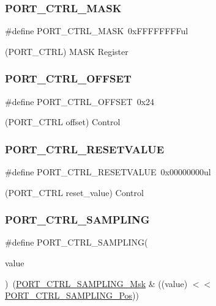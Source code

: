\subsubsection{\texorpdfstring{PORT\_CTRL\_MASK}{PORT\_CTRL\_MASK}}
{\footnotesize\ttfamily \#define P\+O\+R\+T\+\_\+\+C\+T\+R\+L\+\_\+\+M\+A\+SK~0x\+F\+F\+F\+F\+F\+F\+F\+Ful}



(P\+O\+R\+T\+\_\+\+C\+T\+RL) M\+A\+SK Register 

\mbox{\label{group___s_a_m_d21___p_o_r_t_ga3a53a2a2a7695aa20f7827ceafcec8d5}} 
\subsubsection{\texorpdfstring{PORT\_CTRL\_OFFSET}{PORT\_CTRL\_OFFSET}}
{\footnotesize\ttfamily \#define P\+O\+R\+T\+\_\+\+C\+T\+R\+L\+\_\+\+O\+F\+F\+S\+ET~0x24}



(P\+O\+R\+T\+\_\+\+C\+T\+RL offset) Control 

\mbox{\label{group___s_a_m_d21___p_o_r_t_ga24912324fee45dc65e6d91dce8b908c3}} 
\subsubsection{\texorpdfstring{PORT\_CTRL\_RESETVALUE}{PORT\_CTRL\_RESETVALUE}}
{\footnotesize\ttfamily \#define P\+O\+R\+T\+\_\+\+C\+T\+R\+L\+\_\+\+R\+E\+S\+E\+T\+V\+A\+L\+UE~0x00000000ul}



(P\+O\+R\+T\+\_\+\+C\+T\+RL reset\+\_\+value) Control 

\mbox{\label{group___s_a_m_d21___p_o_r_t_ga8992de32f5013d24b45021d6e972ff87}} 
\subsubsection{\texorpdfstring{PORT\_CTRL\_SAMPLING}{PORT\_CTRL\_SAMPLING}}
{\footnotesize\ttfamily \#define P\+O\+R\+T\+\_\+\+C\+T\+R\+L\+\_\+\+S\+A\+M\+P\+L\+I\+NG(\begin{DoxyParamCaption}\item[{}]{value }\end{DoxyParamCaption})~(\mbox{\hyperlink{group___s_a_m_d21___p_o_r_t_ga1ca0c4a14f1f5fdcecb663287a093638}{P\+O\+R\+T\+\_\+\+C\+T\+R\+L\+\_\+\+S\+A\+M\+P\+L\+I\+N\+G\+\_\+\+Msk}} \& ((value) $<$$<$ \mbox{\hyperlink{group___s_a_m_d21___p_o_r_t_gaf27535115d3c255e443dbe76e1e1a03c}{P\+O\+R\+T\+\_\+\+C\+T\+R\+L\+\_\+\+S\+A\+M\+P\+L\+I\+N\+G\+\_\+\+Pos}}))}

